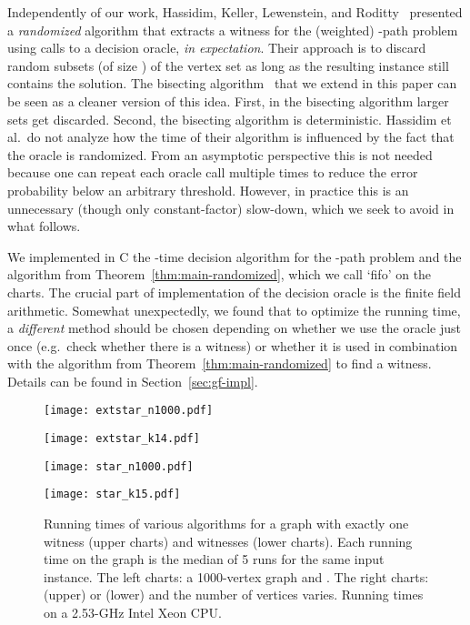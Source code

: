 \documentclass[11pt]{article}
\begin{document}
Independently of our work, Hassidim, Keller, Lewenstein, and Roditty~\cite{hklr_wads} presented a {\em randomized} algorithm that extracts a witness for the (weighted) -path problem using  calls to a decision oracle, {\em in expectation}. 
Their approach is to discard random subsets (of size ) of the vertex set as long as the resulting instance still contains the solution. The bisecting algorithm~\cite{DuHwang1993} that we extend in this paper can be seen as a cleaner version of this idea.
First, in the bisecting algorithm larger sets get discarded. Second, the bisecting algorithm is deterministic. 
Hassidim et al.\ do not analyze how the time of their algorithm is influenced by the fact that the oracle is randomized. From an asymptotic perspective this is not needed because one can repeat each oracle call multiple times to reduce the error probability below an arbitrary threshold. However, in practice this is an unnecessary (though only constant-factor) slow-down, which we seek to avoid in what follows.

We implemented in C the -time decision algorithm for the -path problem and the algorithm from Theorem~\ref{thm:main-randomized}, which we call `fifo' on the charts. 
The crucial part of implementation of the decision oracle is the finite field arithmetic. 
Somewhat unexpectedly, we found that to optimize the running time, a {\em different} method should be chosen depending on whether we use the oracle just once (e.g.\ check whether there is a witness) or whether it is used in combination with the algorithm from Theorem~\ref{thm:main-randomized} to find a witness.
Details can be found in Section~\ref{sec:gf-impl}.

\begin{figure}[t]
\begin{minipage}[b]{0.5\linewidth}
\centering
\texttt{[image: extstar\_n1000.pdf]}
\end{minipage}
\begin{minipage}[b]{0.5\linewidth}
\centering
\texttt{[image: extstar\_k14.pdf]}
\end{minipage}
\begin{minipage}[b]{0.5\linewidth}
\centering
\texttt{[image: star\_n1000.pdf]}
\end{minipage}
\begin{minipage}[b]{0.5\linewidth}
\centering
\texttt{[image: star\_k15.pdf]}
\end{minipage}
\caption{\label{fig:alg_charts}
         Running times of various algorithms for a graph with exactly one witness (upper charts) and   witnesses (lower charts). 
         Each running time on the graph is the median of 5 runs for the same input instance.
         The left charts: a 1000-vertex graph and .
         The right charts:  (upper) or  (lower) and the number of vertices varies. Running times on a 2.53-GHz Intel Xeon CPU.
         }
\end{figure}
\end{document}
